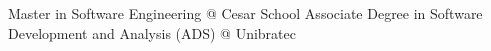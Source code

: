 %
%
%


\begin{scholarship}
					{Master in Software Engineering @ Cesar School}
					{Associate Degree in Software Development and Analysis (ADS) @ Unibratec}
\end{scholarship}